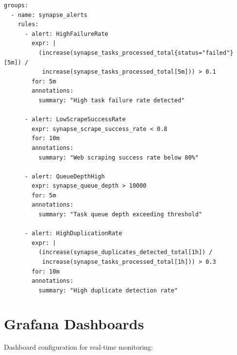 \documentclass[12pt,a4paper]{report}
\begin{document}
\begin{lstlisting}
groups:
  - name: synapse_alerts
    rules:
      - alert: HighFailureRate
        expr: |
          (increase(synapse_tasks_processed_total{status="failed"}[5m]) /
           increase(synapse_tasks_processed_total[5m])) > 0.1
        for: 5m
        annotations:
          summary: "High task failure rate detected"
      
      - alert: LowScrapeSuccessRate
        expr: synapse_scrape_success_rate < 0.8
        for: 10m
        annotations:
          summary: "Web scraping success rate below 80%"
      
      - alert: QueueDepthHigh
        expr: synapse_queue_depth > 10000
        for: 5m
        annotations:
          summary: "Task queue depth exceeding threshold"
      
      - alert: HighDuplicationRate
        expr: |
          (increase(synapse_duplicates_detected_total[1h]) /
           increase(synapse_tasks_processed_total[1h])) > 0.3
        for: 10m
        annotations:
          summary: "High duplicate detection rate"
\end{lstlisting}

\section{Grafana Dashboards}

Dashboard configuration for real-time monitoring:
\end{document}
